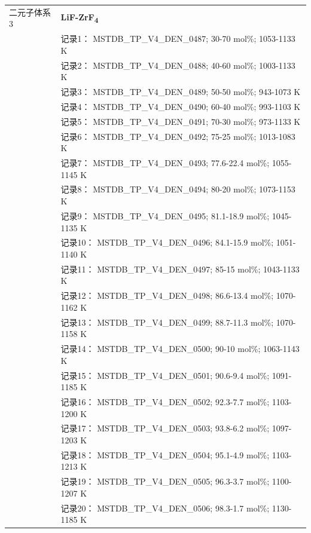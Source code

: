 \documentclass[12pt]{article}
\begin{document}
{\begin{longtable}[]{@{}
  >{\raggedright\arraybackslash}p{}
  >{\raggedright\arraybackslash}p{}@{}}
二元子体系 3  & \textbf{LiF-ZrF\textsubscript{4}} \\
 & 记录1： MSTDB\_TP\_V4\_DEN\_0487; 30-70 mol\%; 1053-1133 K \\
 & 记录2： MSTDB\_TP\_V4\_DEN\_0488; 40-60 mol\%; 1003-1133 K \\
 & 记录3： MSTDB\_TP\_V4\_DEN\_0489; 50-50 mol\%; 943-1073 K \\
 & 记录4： MSTDB\_TP\_V4\_DEN\_0490; 60-40 mol\%; 993-1103 K \\
 & 记录5： MSTDB\_TP\_V4\_DEN\_0491; 70-30 mol\%; 973-1133 K \\
 & 记录6： MSTDB\_TP\_V4\_DEN\_0492; 75-25 mol\%; 1013-1083 K \\
 & 记录7： MSTDB\_TP\_V4\_DEN\_0493; 77.6-22.4 mol\%; 1055-1145 K \\
 & 记录8： MSTDB\_TP\_V4\_DEN\_0494; 80-20 mol\%; 1073-1153 K \\
 & 记录9： MSTDB\_TP\_V4\_DEN\_0495; 81.1-18.9 mol\%; 1045-1135 K \\
 & 记录10： MSTDB\_TP\_V4\_DEN\_0496; 84.1-15.9 mol\%; 1051-1140 K \\
 & 记录11： MSTDB\_TP\_V4\_DEN\_0497; 85-15 mol\%; 1043-1133 K \\
 & 记录12： MSTDB\_TP\_V4\_DEN\_0498; 86.6-13.4 mol\%; 1070-1162 K \\
 & 记录13： MSTDB\_TP\_V4\_DEN\_0499; 88.7-11.3 mol\%; 1070-1158 K \\
 & 记录14： MSTDB\_TP\_V4\_DEN\_0500; 90-10 mol\%; 1063-1143 K \\
 & 记录15： MSTDB\_TP\_V4\_DEN\_0501; 90.6-9.4 mol\%; 1091-1185 K \\
 & 记录16： MSTDB\_TP\_V4\_DEN\_0502; 92.3-7.7 mol\%; 1103-1200 K \\
 & 记录17： MSTDB\_TP\_V4\_DEN\_0503; 93.8-6.2 mol\%; 1097-1203 K \\
 & 记录18： MSTDB\_TP\_V4\_DEN\_0504; 95.1-4.9 mol\%; 1103-1213 K \\
 & 记录19： MSTDB\_TP\_V4\_DEN\_0505; 96.3-3.7 mol\%; 1100-1207 K \\
 & 记录20： MSTDB\_TP\_V4\_DEN\_0506; 98.3-1.7 mol\%; 1130-1185 K  \\


\end{longtable}}
\end{document}
